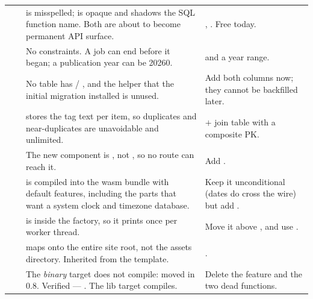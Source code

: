 \begin{longtable}{@{}p{}p{}L{0.375\textwidth}L{0.40\textwidth}@{}}
 &  &  is misspelled;  is opaque and
shadows the SQL  function name. Both are about to become permanent API surface. &
, . Free today. \\

 &  & No  constraints. A job can end before it began; a
publication year can be 20260. &  and a
year range. \\

 &  & No table has  / , and the
 helper that the initial migration installed is unused. & Add
both columns now; they cannot be backfilled later. \\

 &  &  stores the tag text per item, so duplicates and
near-duplicates are unavoidable and unlimited. &  $+$  join
table with a composite PK. \\

 &  & The new  component is , not
, so no route can reach it. & Add . \\

 &  &  is compiled into the wasm bundle with default features,
including the parts that want a system clock and timezone database. & Keep it unconditional (dates
do cross the wire) but add . \\

 &  &  is inside the 
factory, so it prints once per worker thread. & Move it above , and use
. \\

 &  &  maps  onto the
entire site root, not the assets directory. Inherited from the template. &
. \\

 &  & The  \emph{binary} target does not compile:
 moved in 0.8. Verified --- . The lib target
compiles. & Delete the  feature and the two dead  functions. \\


\end{longtable}
